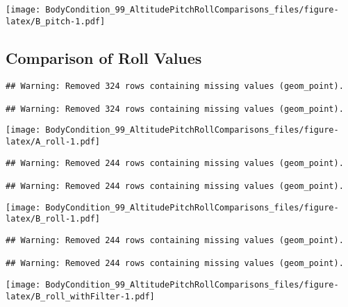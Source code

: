 \documentclass[
]{article}
\begin{document}
\texttt{[image: BodyCondition\_99\_AltitudePitchRollComparisons\_files/figure-latex/B\_pitch-1.pdf]}

\hypertarget{comparison-of-roll-values}{%
\subsection{Comparison of Roll Values}\label{comparison-of-roll-values}}

\begin{verbatim}
## Warning: Removed 324 rows containing missing values (geom_point).

## Warning: Removed 324 rows containing missing values (geom_point).
\end{verbatim}

\texttt{[image: BodyCondition\_99\_AltitudePitchRollComparisons\_files/figure-latex/A\_roll-1.pdf]}

\begin{verbatim}
## Warning: Removed 244 rows containing missing values (geom_point).

## Warning: Removed 244 rows containing missing values (geom_point).
\end{verbatim}

\texttt{[image: BodyCondition\_99\_AltitudePitchRollComparisons\_files/figure-latex/B\_roll-1.pdf]}

\begin{verbatim}
## Warning: Removed 244 rows containing missing values (geom_point).

## Warning: Removed 244 rows containing missing values (geom_point).
\end{verbatim}

\texttt{[image: BodyCondition\_99\_AltitudePitchRollComparisons\_files/figure-latex/B\_roll\_withFilter-1.pdf]}
\end{document}
